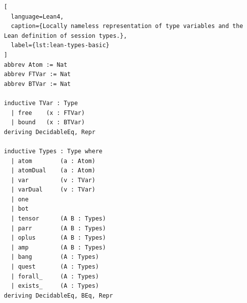 \begin{lstlisting}[
  language=Lean4,
  caption={Locally nameless representation of type variables and the Lean definition of session types.},
  label={lst:lean-types-basic}
]
abbrev Atom := Nat
abbrev FTVar := Nat
abbrev BTVar := Nat

inductive TVar : Type
  | free    (x : FTVar)
  | bound   (x : BTVar)
deriving DecidableEq, Repr

inductive Types : Type where
  | atom        (a : Atom)
  | atomDual    (a : Atom)
  | var         (v : TVar)
  | varDual     (v : TVar)
  | one
  | bot
  | tensor      (A B : Types)
  | parr        (A B : Types)
  | oplus       (A B : Types)
  | amp         (A B : Types)
  | bang        (A : Types)
  | quest       (A : Types)
  | forall_     (A : Types)
  | exists_     (A : Types)
deriving DecidableEq, BEq, Repr
\end{lstlisting}




